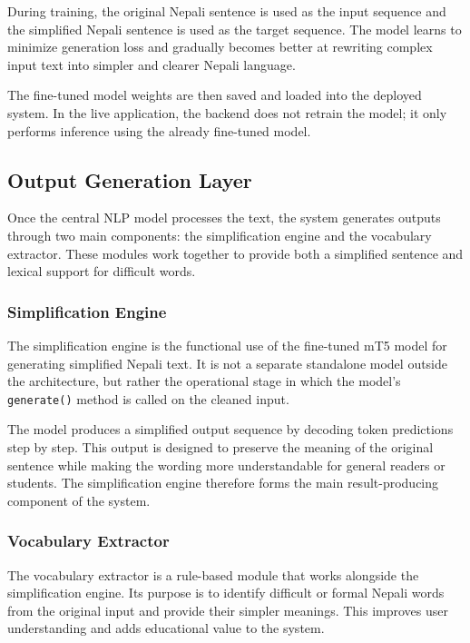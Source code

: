 \documentclass[12pt]{report}
\begin{document}
During training, the original Nepali sentence is used as the input sequence and the simplified Nepali sentence is used as the target sequence. The model learns to minimize generation loss and gradually becomes better at rewriting complex input text into simpler and clearer Nepali language.

The fine-tuned model weights are then saved and loaded into the deployed system. In the live application, the backend does not retrain the model; it only performs inference using the already fine-tuned model.

\subsection{Output Generation Layer}

Once the central NLP model processes the text, the system generates outputs through two main components: the simplification engine and the vocabulary extractor. These modules work together to provide both a simplified sentence and lexical support for difficult words.

\subsubsection{Simplification Engine}

The simplification engine is the functional use of the fine-tuned mT5 model for generating simplified Nepali text. It is not a separate standalone model outside the architecture, but rather the operational stage in which the model's \texttt{generate()} method is called on the cleaned input.

The model produces a simplified output sequence by decoding token predictions step by step. This output is designed to preserve the meaning of the original sentence while making the wording more understandable for general readers or students. The simplification engine therefore forms the main result-producing component of the system.

\subsubsection{Vocabulary Extractor}

The vocabulary extractor is a rule-based module that works alongside the simplification engine. Its purpose is to identify difficult or formal Nepali words from the original input and provide their simpler meanings. This improves user understanding and adds educational value to the system.
\end{document}
